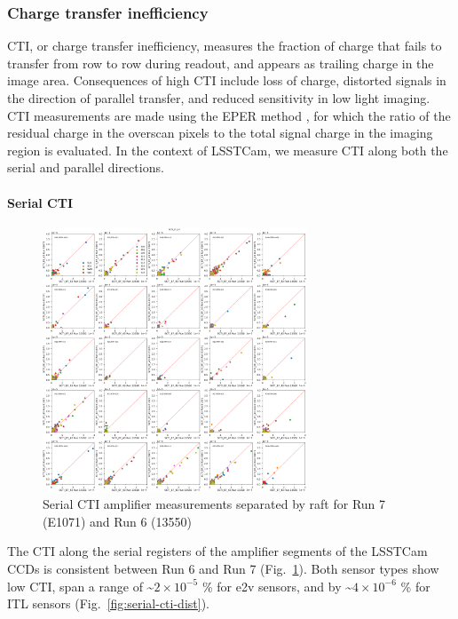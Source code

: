 \subsubsection{Charge transfer
inefficiency}\label{charge-transfer-inefficiency}

CTI, or charge transfer inefficiency, measures the fraction of charge that fails to transfer from row to row during readout, and appears as trailing charge in the image area. Consequences of high CTI include loss of charge, distorted signals in the direction of parallel transfer, and reduced sensitivity in low light imaging. CTI measurements are made using the EPER method \citep{2021JATIS...7d8002S}, for which the ratio of the residual charge in the overscan pixels to the total signal charge in the imaging region is evaluated. In the context of LSSTCam, we measure CTI along both the serial and parallel directions.

\paragraph{Serial CTI}\label{serial-cti}

\begin{figure}[ht]
\begin{centering}
\includegraphics[width=0.7\textwidth]{figures/baselineCharacterization/13550_E1071_SCTI_EF_43_inset.png}
	\caption{Serial CTI amplifier measurements separated by raft for Run 7 (E1071) and Run 6 (13550)\label{fig:serial-cti}}
\end{centering}
\end{figure}

The CTI along the serial registers of the amplifier segments of the LSSTCam CCDs is consistent between Run 6 and
Run 7 (Fig.~\ref{fig:serial-cti}). Both sensor types show low CTI,
span a range  of \textasciitilde$2 \times 10^{-5}$ \% for e2v sensors, and
by \textasciitilde$4 \times 10^{-6}$  \% for ITL sensors (Fig.~\ref{fig:serial-cti-dist}).


